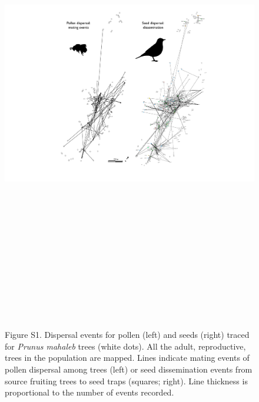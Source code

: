 \documentclass[a4paper, 12pt]{article}
\begin{document}
\begin{figure}[htbp]
\centerline{\includegraphics[height=21cm]{FigS1.pdf}}
%
\caption*{Figure S1. Dispersal events for pollen (left) and seeds (right) traced for \textit{Prunus mahaleb} trees (white dots). All the adult, reproductive, trees in the population are mapped. Lines indicate mating events of pollen dispersal among trees (left) or seed dissemination events from source fruiting trees to seed traps (squares; right). Line thickness is proportional to the number of events recorded.}
\end{figure}

\newpage 
\end{document}
